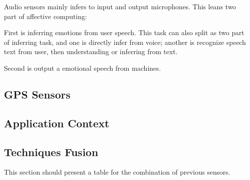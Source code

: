 Audio sensors mainly infers to input and output microphones. This leans two part of affective computing:

First is inferring emotions from user speech. 
This task can also split as two part of inferring task, and one is directly infer from voice;
another is recognize speech text from user, then understanding or inferring from text.

Second is output a emotional speech from machines.

\subsection{GPS Sensors}
\label{subsec:gps}

\subsection{Application Context}
\label{subsec:ui}

\subsection{Techniques Fusion}
\label{subsec:fusion}


This section should present a table for the combination of previous sensors.
